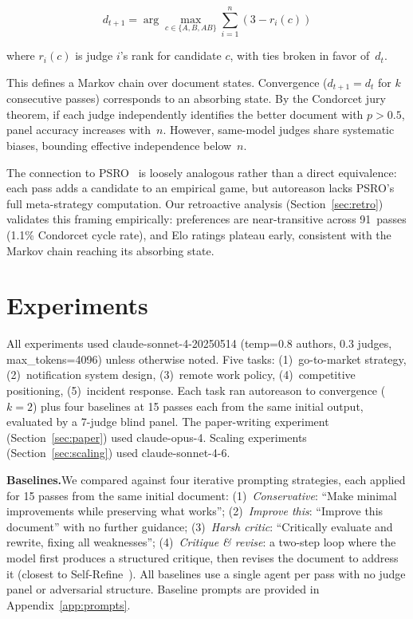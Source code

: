 \documentclass[10pt,twocolumn]{article}
\begin{document}
$$d_{t+1} = \arg\max_{c \in \{A, B, AB\}} \sum_{i=1}^{n} (3 - r_i(c))$$

where $r_i(c)$ is judge $i$'s rank for candidate $c$, with ties broken in favor of~$d_t$.

This defines a Markov chain over document states. Convergence ($d_{t+1} = d_t$ for $k$ consecutive passes) corresponds to an absorbing state. By the Condorcet jury theorem, if each judge independently identifies the better document with $p > 0.5$, panel accuracy increases with~$n$. However, same-model judges share systematic biases, bounding effective independence below~$n$.

The connection to PSRO~\cite{psro} is loosely analogous rather than a direct equivalence: each pass adds a candidate to an empirical game, but autoreason lacks PSRO's full meta-strategy computation. Our retroactive analysis (Section~\ref{sec:retro}) validates this framing empirically: preferences are near-transitive across 91~passes (1.1\% Condorcet cycle rate), and Elo ratings plateau early, consistent with the Markov chain reaching its absorbing state.

\section{Experiments}

All experiments used claude-sonnet-4-20250514 (temp=0.8 authors, 0.3 judges, max\_tokens=4096) unless otherwise noted. Five tasks: (1)~go-to-market strategy, (2)~notification system design, (3)~remote work policy, (4)~competitive positioning, (5)~incident response. Each task ran autoreason to convergence ($k{=}2$) plus four baselines at 15 passes each from the same initial output, evaluated by a 7-judge blind panel. The paper-writing experiment (Section~\ref{sec:paper}) used claude-opus-4. Scaling experiments (Section~\ref{sec:scaling}) used claude-sonnet-4-6.

\textbf{Baselines.}\enspace We compared against four iterative prompting strategies, each applied for 15 passes from the same initial document: (1)~\textit{Conservative}: ``Make minimal improvements while preserving what works''; (2)~\textit{Improve this}: ``Improve this document'' with no further guidance; (3)~\textit{Harsh critic}: ``Critically evaluate and rewrite, fixing all weaknesses''; (4)~\textit{Critique \& revise}: a two-step loop where the model first produces a structured critique, then revises the document to address it (closest to Self-Refine~\cite{selfrefine}). All baselines use a single agent per pass with no judge panel or adversarial structure. Baseline prompts are provided in Appendix~\ref{app:prompts}.
\end{document}
